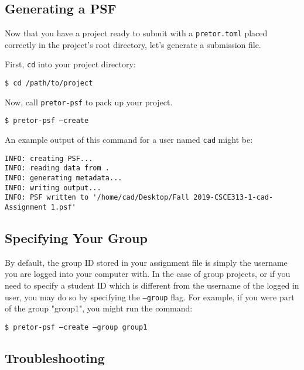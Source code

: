 \documentclass{article}
\begin{document}
\subsection{Generating a PSF}


Now that you have a project ready to submit with a \texttt{pretor.toml} placed
correctly in the project's root directory, let's generate a submission file.


First, \texttt{cd} into your project directory:

\texttt{\$ cd /path/to/project}

Now, call \texttt{pretor-psf} to pack up your project.

\texttt{\$ pretor-psf --create}

An example output of this command for a user named \texttt{cad} might be:

\begin{verbatim}
INFO: creating PSF...
INFO: reading data from .
INFO: generating metadata...
INFO: writing output...
INFO: PSF written to '/home/cad/Desktop/Fall 2019-CSCE313-1-cad-Assignment 1.psf'
\end{verbatim}

\subsection{Specifying Your Group}

By default, the group ID stored in your assignment file is simply the username
you are logged into your computer with.  In the case of group projects, or if
you need to specify a student ID which is different from the username of the
logged in user, you may do so by specifying the \texttt{--group} flag. For
example, if you were part of the group "group1", you might run the command:

\texttt{\$ pretor-psf --create --group group1}


\subsection{Troubleshooting}
\end{document}
